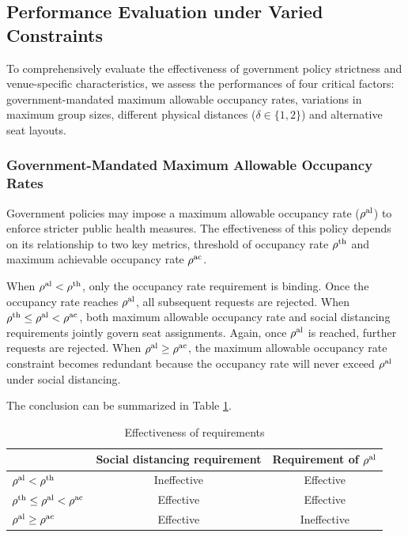 
\subsection{Performance Evaluation under Varied Constraints}\label{perf_constraints}
To comprehensively evaluate the effectiveness of government policy strictness and venue-specific characteristics, we assess the performances of four critical factors: government-mandated maximum allowable occupancy rates, variations in maximum group sizes, different physical distances ($\delta \in \{1,2\}$) and alternative seat layouts.


\subsubsection{Government-Mandated Maximum Allowable Occupancy Rates}

Government policies may impose a maximum allowable occupancy rate ($\rho^{\textup{al}}$) to enforce stricter public health measures. The effectiveness of this policy depends on its relationship to two key metrics, threshold of occupancy rate $\rho^{\textup{th}}$ and maximum achievable occupancy rate $\rho^{\textup{ac}}$.

When $\rho^{\textup{al}} < \rho^{\textup{th}}$, only the occupancy rate requirement is binding. Once the occupancy rate reaches $\rho^{\textup{al}}$, all subsequent requests are rejected. When $\rho^{\textup{th}} \leq \rho^{\textup{al}} < \rho^{\textup{ac}}$, both maximum allowable occupancy rate and social distancing requirements jointly govern seat assignments. Again, once $\rho^{\textup{al}}$ is reached, further requests are rejected. When $\rho^{\textup{al}} \geq \rho^{\textup{ac}}$, the maximum allowable occupancy rate constraint becomes redundant because the occupancy rate will never exceed $\rho^{\textup{al}}$ under social distancing.


The conclusion can be summarized in Table \ref{tab_requirement}.
\begin{table}[ht]
  \centering
  \caption{Effectiveness of requirements}\label{tab_requirement}
  \begin{tabular}{lcc}
  \hline
  \hline
   & Social distancing requirement & Requirement of $\rho^{\textup{al}}$ \\
  \hline
  $\rho^{\textup{al}} < \rho^{\textup{th}}$            & Ineffective & Effective \\
  $\rho^{\textup{th}} \leq \rho^{\textup{al}} < \rho^{\textup{ac}}$  & Effective   & Effective \\
  $\rho^{\textup{al}} \geq \rho^{\textup{ac}}$                  & Effective   & Ineffective \\
   \hline
   \hline
  \end{tabular}
\end{table}


